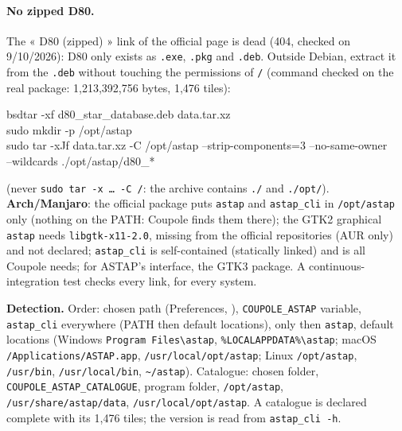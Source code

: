 \paragraph{No zipped D80.} The « D80 (zipped) » link of the official page is dead (404, checked on 9/10/2026): D80
only exists as \texttt{.exe}, \texttt{.pkg} and \texttt{.deb}. Outside Debian, extract it from the \texttt{.deb}
without touching the permissions of \texttt{/} (command checked on the real package: 1,213,392,756 bytes, 1,476
tiles):
\begin{ccode}
bsdtar -xf d80\_star\_database.deb data.tar.xz\\
sudo mkdir -p /opt/astap\\
sudo tar -xJf data.tar.xz -C /opt/astap --strip-components=3 --no-same-owner\\
\hspace*{2em}--wildcards \textquotesingle./opt/astap/d80\_*\textquotesingle
\end{ccode}
(never \texttt{sudo tar -x … -C /}: the archive contains \texttt{./} and \texttt{./opt/}). \textbf{Arch/Manjaro}: the
official package puts \texttt{astap} and \texttt{astap\_cli} in \texttt{/opt/astap} only (nothing on the PATH:
Coupole finds them there); the GTK2 graphical \texttt{astap} needs \texttt{libgtk-x11-2.0}, missing from the official
repositories (AUR only) and not declared; \texttt{astap\_cli} is self-contained (statically linked) and is all
Coupole needs; for ASTAP's interface, the GTK3 package. A continuous-integration test checks every link, for every
system.

\begin{sloppypar}\noindent\textbf{Detection.} Order: chosen path (Preferences, ),
\texttt{COUPOLE\_ASTAP} variable, \texttt{astap\_cli} everywhere (PATH then default locations), only then \texttt{astap}, default locations (Windows
\texttt{Program Files\textbackslash astap}, \texttt{\%LOCALAPPDATA\%\textbackslash astap}; macOS
\texttt{/Applications/ASTAP.app}, \texttt{/usr/local/opt/astap}; Linux \texttt{/opt/astap}, \texttt{/usr/bin},
\texttt{/usr/local/bin}, \texttt{\textasciitilde/astap}). Catalogue: chosen folder, \texttt{COUPOLE\_ASTAP\_CATALOGUE},
program folder, \texttt{/opt/astap}, \texttt{/usr/share/astap/data}, \texttt{/usr/local/opt/astap}. A catalogue is
declared complete with its 1,476 tiles; the version is read from \texttt{astap\_cli -h}.\end{sloppypar}



